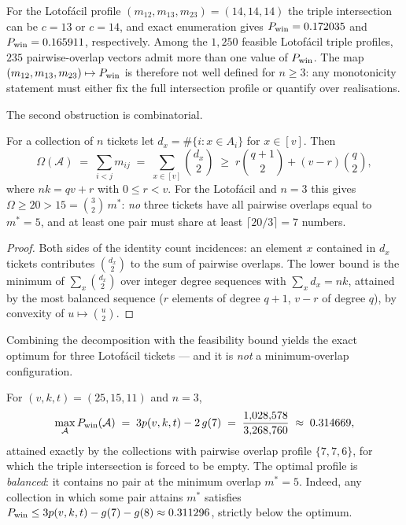 \begin{example}
  \label{ex:ill-posed}
  For the Lotofácil profile $(m_{12},m_{13},m_{23}) = (14,14,14)$ the
  triple intersection can be $c = 13$ or $c = 14$, and exact enumeration
  gives $P_{\mathrm{win}} = 0.172035$ and $P_{\mathrm{win}} = 0.165911$, respectively.  Among
  the $1{,}250$ feasible Lotofácil triple profiles, $235$
  pairwise-overlap vectors admit more than one value of $P_{\mathrm{win}}$.  The map
  $(m_{12},m_{13},m_{23}) \mapsto P_{\mathrm{win}}$ is therefore not well defined for
  $n \ge 3$: any monotonicity statement must either fix the full
  intersection profile or quantify over realisations.
\end{example}

The second obstruction is combinatorial.

\begin{proposition}
  \label{prop:degree-bound}
  For a collection of $n$ tickets let $d_x = \#\{i : x \in A_i\}$ for
  $x \in [v]$.  Then
  \[
    \Omega(\mathcal{A}) \;=\; \sum_{i<j} m_{ij}
    \;=\; \sum_{x \in [v]} \binom{d_x}{2}
    \;\ge\; r \binom{q+1}{2} + (v - r)\binom{q}{2},
  \]
  where $nk = qv + r$ with $0 \le r < v$.  For the Lotofácil and $n = 3$
  this gives $\Omega \ge 20 > 15 = \binom{3}{2}\, m^*$: \emph{no} three
  tickets have all pairwise overlaps equal to $m^* = 5$, and at least one
  pair must share at least $\lceil 20/3 \rceil = 7$ numbers.
\end{proposition}

\begin{proof}
  Both sides of the identity count incidences: an element $x$ contained in
  $d_x$ tickets contributes $\binom{d_x}{2}$ to the sum of pairwise
  overlaps.  The lower bound is the minimum of $\sum_x \binom{d_x}{2}$
  over integer degree sequences with $\sum_x d_x = nk$, attained by the
  most balanced sequence ($r$ elements of degree $q+1$, $v-r$ of degree
  $q$), by convexity of $u \mapsto \binom{u}{2}$.
\end{proof}

Combining the decomposition with the feasibility bound yields the exact
optimum for three Lotofácil tickets --- and it is \emph{not} a
minimum-overlap configuration.

\begin{theorem}
  \label{thm:three-optimal}
  For $(v,k,t) = (25,15,11)$ and $n = 3$,
  \[
    \max_{\mathcal{A}} P_{\mathrm{win}}(\mathcal{A})
    \;=\; 3p(v,k,t) - 2\,g(7)
    \;=\; \frac{1{,}028{,}578}{3{,}268{,}760}
    \;\approx\; 0.314669,
  \]
  attained exactly by the collections with pairwise overlap profile
  $\{7,7,6\}$, for which the triple intersection is forced to be empty.
  The optimal profile is \emph{balanced}: it contains no pair at the
  minimum overlap $m^* = 5$.  Indeed, any collection in which some pair
  attains $m^*$ satisfies
  $P_{\mathrm{win}} \le 3p(v,k,t) - g(7) - g(8) \approx 0.311296$, strictly below the
  optimum.
\end{theorem}

